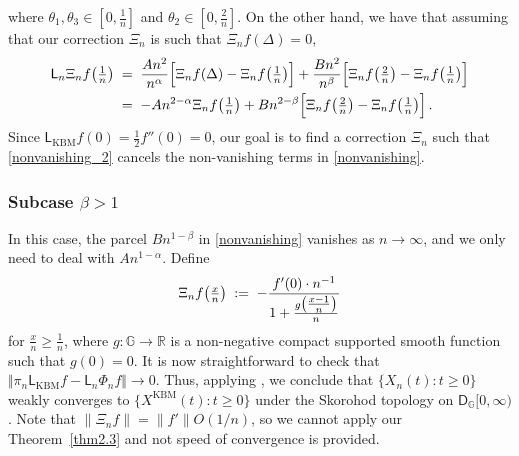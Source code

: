 \documentclass[12pt,a4paper]{article}
\theoremstyle{plain}
\theoremstyle{remark}
\newcommand{\msf}[1]{{\mathsf #1}}
\newcommand{\bb}[1]{{\mathbb #1}}
\newcommand{\norm}[1]{\lVert#1\rVert}
\newcommand{\pfrac}[2]{\genfrac{}{}{}{1}{#1}{#2}}
\newcommand{\pn}[1]{\big(\pfrac{#1}{n}\big)}
\begin{document}
	where $\theta_1, \theta_3\in [0, \frac{1}{n}]$ and $\theta_2\in [0,\frac2n]$.
	On the other hand, we have that assuming that our correction $\Xi_n$ is such that $\Xi_nf(\Delta)=0$,
	\begin{align}
		\msf{L}_n\Xi_nf\pn{1} &\; =\;  \frac{An^2}{n^\alpha}\Big[\Xi_nf(\Delta) - \Xi_nf\pn{1}\Big] +\frac{Bn^2}{n^\beta}\Big[ \Xi_nf\pn{2} - \Xi_nf\pn{1}\Big]\notag\\
		&\; =\;  -An^{2-\alpha}\Xi_nf\pn{1} +Bn^{2-\beta}\Big[ \Xi_nf\pn{2} - \Xi_nf\pn{1}\Big]\,.\label{nonvanishing_2}
	\end{align}
	Since $\msf{L}_{\text{KBM}}f(0) = \frac{1}{2}f''(0) = 0$, our goal is to find a correction $\Xi_n$ such that \eqref{nonvanishing_2} cancels the non-vanishing terms in \eqref{nonvanishing}.
	
	\subsubsection{Subcase \texorpdfstring{$\beta>1$}{beta>1}}
	In this case, the parcel $Bn^{1-\beta}$ in \eqref{nonvanishing} vanishes as $n\to\infty$, and we only need to deal with $An^{1-\alpha}$.
	Define
	\begin{align*}
		\Xi_nf\pn{x}\;:=\; -\frac{f'(0)\cdot n^{-1}}{1+\frac{g\pn{x-1}}{n}}
	\end{align*}
	for $\frac{x}{n} \geq \frac{1}{n}$,  where $g: \bb G \to \bb R$ is a non-negative compact supported smooth function such that $g(0)=0$. It is now straightforward to check that  $	\Vert  \pi_n \msf{L}_{\text{KBM}}f-\msf{L}_n\Phi_nf \Vert \to 0$.
	Thus,  applying  \citet[Theorem~6.1, page~28 and Theorem~2.11, page~172]{EK}, we conclude that $\{X_{n}(t): t \geq 0\}$ weakly converges to $\{X^{\text{KBM}}(t): t\geq 0\}$ under the Skorohod topology on $\msf{D}_\bb{G}[0,\infty)$. Note that $\norm{\Xi_n f} = \norm{f'}O(1/n)$, so we cannot apply our Theorem~\ref{thm2.3} and not speed of convergence is provided.
	
\end{document}
